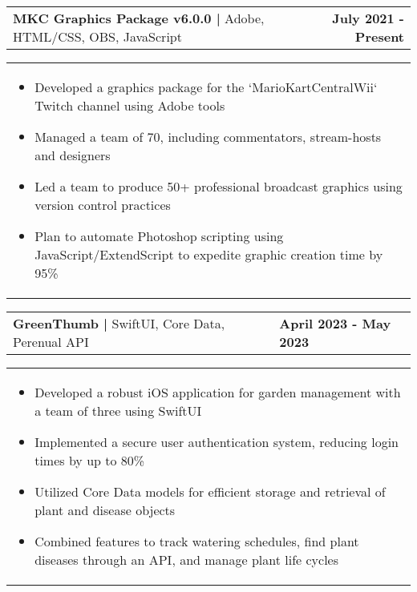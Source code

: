 \documentclass[10pt]{article}
\begin{document}
\vspace{-5pt}



\noindent \begin{tabularx}{\textwidth}{X r}
\textbf{MKC Graphics Package v6.0.0 | } Adobe, HTML/CSS, OBS, JavaScript & \textbf{July 2021 - Present} \\
\end{tabularx}

\vspace{-5pt}

\noindent \begin{tabularx}{\textwidth}{X}
\begin{itemize}[leftmargin=0.75cm, noitemsep, topsep=0pt, parsep=0pt, partopsep=0pt]
\item Developed a graphics package for the `MarioKartCentralWii` Twitch channel using Adobe tools
\item Managed a team of 70, including commentators, stream-hosts and designers
\item Led a team to produce 50+ professional broadcast graphics using version control practices
\item Plan to automate Photoshop scripting using JavaScript/ExtendScript to expedite graphic creation time by 95\%
\end{itemize}
\end{tabularx}

\vspace{-5pt}


\noindent \begin{tabularx}{\textwidth}{X >{\raggedleft\arraybackslash}X}
\textbf{GreenThumb | } SwiftUI, Core Data, Perenual API & \textbf{April 2023 - May 2023} \\
\end{tabularx}

\vspace{-5pt}

\noindent \begin{tabularx}{\textwidth}{X}
\begin{itemize}[leftmargin=0.75cm, noitemsep, topsep=0pt, parsep=0pt, partopsep=0pt]
\item Developed a robust iOS application for garden management with a team of three using SwiftUI
\item Implemented a secure user authentication system, reducing login times by up to 80\%
\item Utilized Core Data models for efficient storage and retrieval of plant and disease objects
\item Combined features to track watering schedules, find plant diseases through an API, and manage plant life cycles
\end{itemize}
\end{tabularx}
\end{document}
